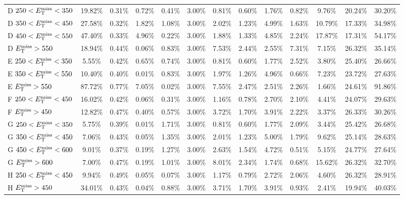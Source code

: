 \begin{table}
\begin{tabular}{|l|ccccccccccc|c|}
 D $250<E_\text{T}^\text{miss}<350$ & 19.82\% & 0.31\%  & 0.72\%  & 0.41\%  & 3.00\%  & 0.81\%  & 0.60\%  & 1.76\%  & 0.82\%  & 9.76\%  & 20.24\% & 30.20\% \\
 D $350<E_\text{T}^\text{miss}<450$ & 27.58\% & 0.32\%  & 1.82\%  & 1.08\%  & 3.00\%  & 2.02\%  & 1.23\%  & 4.99\%  & 1.63\%  & 10.79\% & 17.33\% & 34.98\% \\
 D $450<E_\text{T}^\text{miss}<550$ & 47.40\% & 0.33\%  & 4.96\%  & 0.22\%  & 3.00\%  & 1.88\%  & 1.33\%  & 4.85\%  & 2.24\%  & 17.87\% & 17.31\% & 54.17\% \\
 D $E_\text{T}^\text{miss}>550$     & 18.94\% & 0.44\%  & 0.06\%  & 0.83\%  & 3.00\%  & 7.53\%  & 2.44\%  & 2.55\%  & 7.31\%  & 7.15\%  & 26.32\% & 35.14\% \\
 E $250<E_\text{T}^\text{miss}<350$ & 5.55\%  & 0.42\%  & 0.65\%  & 0.74\%  & 3.00\%  & 0.81\%  & 0.60\%  & 1.77\%  & 2.52\%  & 3.80\%  & 25.40\% & 26.66\% \\
 E $350<E_\text{T}^\text{miss}<550$ & 10.40\% & 0.40\%  & 0.01\%  & 0.83\%  & 3.00\%  & 1.97\%  & 1.26\%  & 4.96\%  & 0.66\%  & 7.23\%  & 23.72\% & 27.63\% \\
 E $E_\text{T}^\text{miss}>550$     & 87.72\% & 0.77\%  & 7.05\%  & 0.02\%  & 3.00\%  & 7.55\%  & 2.47\%  & 2.51\%  & 2.26\%  & 1.66\%  & 24.61\% & 91.86\% \\
 F $250<E_\text{T}^\text{miss}<450$ & 16.02\% & 0.42\%  & 0.06\%  & 0.31\%  & 3.00\%  & 1.16\%  & 0.78\%  & 2.70\%  & 2.10\%  & 4.41\%  & 24.07\% & 29.63\% \\
 F $E_\text{T}^\text{miss}>450$     & 12.82\% & 0.47\%  & 0.40\%  & 0.57\%  & 3.00\%  & 3.72\%  & 1.70\%  & 3.91\%  & 2.22\%  & 3.37\%  & 26.33\% & 30.26\% \\
 G $250<E_\text{T}^\text{miss}<350$ & 5.75\%  & 0.39\%  & 0.01\%  & 1.71\%  & 3.00\%  & 0.81\%  & 0.60\%  & 1.77\%  & 2.09\%  & 3.44\%  & 25.42\% & 26.68\% \\
 G $350<E_\text{T}^\text{miss}<450$ & 7.06\%  & 0.43\%  & 0.05\%  & 1.35\%  & 3.00\%  & 2.01\%  & 1.23\%  & 5.00\%  & 1.79\%  & 9.62\%  & 25.14\% & 28.63\% \\
 G $450<E_\text{T}^\text{miss}<600$ & 9.01\%  & 0.37\%  & 0.19\%  & 1.27\%  & 3.00\%  & 2.63\%  & 1.54\%  & 4.72\%  & 0.51\%  & 5.15\%  & 24.77\% & 27.64\% \\
 G $E_\text{T}^\text{miss}>600$     & 7.00\%  & 0.47\%  & 0.19\%  & 1.01\%  & 3.00\%  & 8.01\%  & 2.34\%  & 1.74\%  & 0.68\%  & 15.62\% & 26.32\% & 32.70\% \\
 H $250<E_\text{T}^\text{miss}<450$ & 9.94\%  & 0.49\%  & 0.05\%  & 0.07\%  & 3.00\%  & 1.17\%  & 0.79\%  & 2.72\%  & 2.06\%  & 4.60\%  & 26.32\% & 28.91\% \\
 H $E_\text{T}^\text{miss}>450$     & 34.01\% & 0.43\%  & 0.04\%  & 0.88\%  & 3.00\%  & 3.71\%  & 1.70\%  & 3.91\%  & 0.93\%  & 2.41\%  & 19.94\% & 40.03\% \\

\end{tabular}
\end{table}

